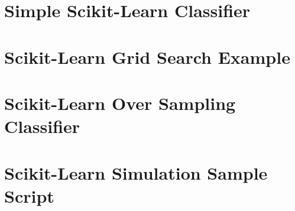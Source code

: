 \section{Simple Scikit-Learn Classifier}
\label{app:simple_scikit}



\section{Scikit-Learn Grid Search Example}
\label{app:grid_scikit}



\section{Scikit-Learn Over Sampling Classifier}
\label{app:over_scikit}



\section{Scikit-Learn Simulation Sample Script}
\label{app:simulation}

